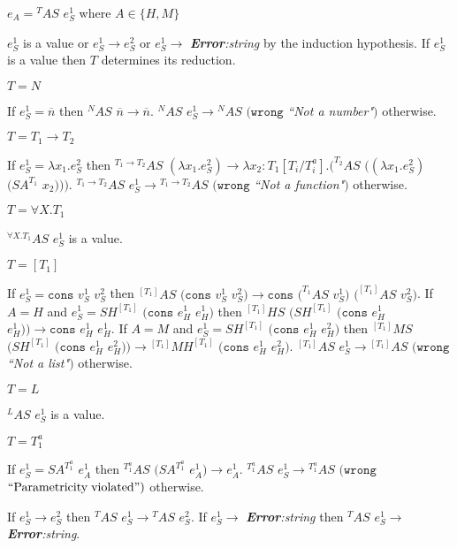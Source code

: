\begin{case}
$e_{A}={^{T}A}S$ $e_{S}^{1}$ where $A\in\lbrace H,M\rbrace$

$e_{S}^{1}$ is a value or $e_{S}^{1}\rightarrow e_{S}^{2}$ or $e_{S}^{1}\rightarrow$ \emph{\textbf{Error}:\;string} by the induction hypothesis.  If $e_{S}^{1}$ is a value then $T$ determines its reduction.
\begin{subcase}
$T=N$

If $e_{S}^{1}=\overline{n}$ then $^{N}AS$ $\overline{n}\rightarrow\overline{n}$.  $^{N}AS$ $e_{S}^{1}\rightarrow{^{N}A}S$ $(\mathtt{wrong}$ \emph{``Not a number"}$)$ otherwise.
\end{subcase}
\begin{subcase}
$T=T_{1}\rightarrow T_{2}$

If $e_{S}^{1}=\lambda x_{1}.e_{S}^{2}$ then $^{T_{1}\rightarrow T_{2}}AS$ $(\lambda x_{1}.e_{S}^{2})\rightarrow\lambda x_{2}:T_{1}[T_{i}/T^{a}_{i}].(^{T_{2}}AS$ $((\lambda x_{1}.e_{S}^{2})$ $(SA^{T_{1}}$ $x_{2})))$.  $^{T_{1}\rightarrow T_{2}}AS$ $e_{S}^{1}\rightarrow{^{T_{1}\rightarrow T_{2}}A}S$ $(\mathtt{wrong}$ \emph{``Not a function"}$)$ otherwise.
\end{subcase}
\begin{subcase}
$T=\forall X.T_{1}$

$^{\forall X.T_{1}}AS$ $e_{S}^{1}$ is a value.
\end{subcase}
\begin{subcase}
$T=[T_{1}]$

If $e_{S}^{1}=\mathtt{cons}$ $v_{S}^{1}$ $v_{S}^{2}$ then $^{[T_{1}]}AS$ $(\mathtt{cons}$ $v_{S}^{1}$ $v_{S}^{2})\rightarrow\mathtt{cons}$ $(^{T_{1}}AS$ $v_{S}^{1})$ $(^{[T_{1}]}AS$ $v_{S}^{2})$.  If $A=H$ and $e_{S}^{1}=SH^{[T_{1}]}$ $(\mathtt{cons}$ $e_{H}^{1}$ $e_{H}^{1})$ then $^{[T_{1}]}HS$ $(SH^{[T_{1}]}$ $(\mathtt{cons}$ $e_{H}^{1}$ $e_{H}^{1}))\rightarrow\mathtt{cons}$ $e_{H}^{1}$ $e_{H}^{1}$.  If $A=M$ and $e_{S}^{1}=SH^{[T_{1}]}$ $(\mathtt{cons}$ $e_{H}^{1}$ $e_{H}^{2})$ then $^{[T_{1}]}MS$ $(SH^{[T_{1}]}$ $(\mathtt{cons}$ $e_{H}^{1}$ $e_{H}^{2}))\rightarrow{^{[T_{1}]}M}H^{[T_{1}]}$ $(\mathtt{cons}$ $e_{H}^{1}$ $e_{H}^{2})$.  $^{[T_{1}]}AS$ $e_{S}^{1}\rightarrow{^{[T_{1}]}A}S$ $(\mathtt{wrong}$ \emph{``Not a list"}$)$ otherwise.
\end{subcase}
\begin{subcase}
$T=L$

$^{L}AS$ $e_{S}^{1}$ is a value.
\end{subcase}
\begin{subcase}
$T=T_{1}^{a}$

If $e_{S}^{1}=SA^{T_{1}^{a}}$ $e_{A}^{1}$ then $^{T_{1}^{a}}AS$ $(SA^{T_{1}^{a}}$ $e_{A}^{1})\rightarrow e_{A}^{1}$.  $^{T_{1}^{a}}AS$ $e_{S}^{1}\rightarrow{^{T_{1}^{a}}A}S$ $(\mathtt{wrong}$ $\mathrm{``Parametricity\;violated"})$ otherwise.
\end{subcase}
If $e_{S}^{1}\rightarrow e_{S}^{2}$ then $^{T}AS$ $e_{S}^{1}\rightarrow{^{T}A}S$ $e_{S}^{2}$.  If $e_{S}^{1}\rightarrow$ \emph{\textbf{Error}:\;string} then $^{T}AS$ $e_{S}^{1}\rightarrow$ \emph{\textbf{Error}:\;string}.
\end{case}